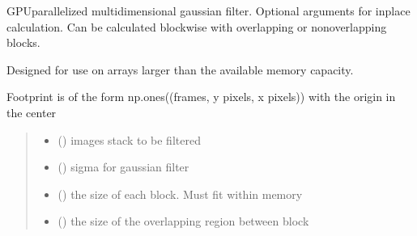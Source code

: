 \documentclass[letterpaper,10pt,english]{sphinxmanual}
\begin{document}
\begin{fulllineitems}
\label{\detokenize{CalSciPy.image_processing:CalSciPy.image_processing.gaussian_filter}}
\pysigstartsignatures
{}
\pysigstopsignatures
\sphinxAtStartPar
GPU\sphinxhyphen{}parallelized multidimensional gaussian filter. Optional arguments for in\sphinxhyphen{}place calculation. Can be calculated
blockwise with overlapping or non\sphinxhyphen{}overlapping blocks.

\sphinxAtStartPar
Designed for use on arrays larger than the available memory capacity.

\sphinxAtStartPar
Footprint is of the form np.ones((frames, y pixels, x pixels)) with the origin in the center
\begin{quote}\begin{description}
\begin{itemize}
\item {} 
\sphinxAtStartPar
{} () \textendash{} images stack to be filtered

\item {} 
\sphinxAtStartPar
{} () \textendash{} sigma for gaussian filter

\item {} 
\sphinxAtStartPar
{} () \textendash{} the size of each block. Must fit within memory

\item {} 
\sphinxAtStartPar
{} () \textendash{} the size of the overlapping region between block


\end{itemize}
\end{description}
\end{quote}
\end{fulllineitems}
\end{document}
